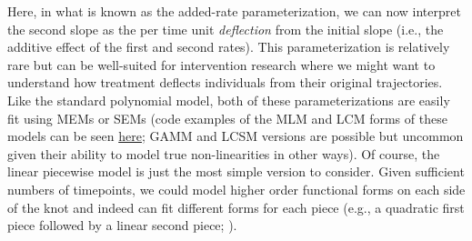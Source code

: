 \documentclass[11pt]{article}
\begin{document}
%
Here, in what is known as the added-rate parameterization, we can now interpret the second slope as the per time unit \textit{deflection} from the initial slope (i.e., the additive effect of the first and second rates). This parameterization is relatively rare but can be well-suited for intervention research where we might want to understand how treatment deflects individuals from their original trajectories. Like the standard polynomial model, both of these parameterizations are easily fit using MEMs or SEMs (code examples of the MLM and LCM forms of these models can be seen \href{https://e-m-mccormick.github.io/static/longitudinal-primer/04-shape.html#piecewise-trajectories}{here}; GAMM and LCSM versions are possible but uncommon given their ability to model true non-linearities in other ways). Of course, the linear piecewise model is just the most simple version to consider. Given sufficient numbers of timepoints, we could model higher order functional forms on each side of the knot and indeed can fit different forms for each piece (e.g., a quadratic first piece followed by a linear second piece; \cite{cudeck_multiphase_2002,mcneish_modeling_2021}).
\end{document}
